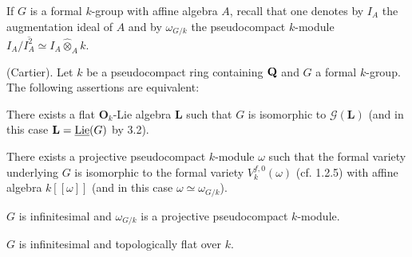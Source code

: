 If $G$ is a formal $k$-group with affine algebra $A$, recall that one denotes by $I_A$ the augmentation ideal of $A$ and by $\omega_{G/k}$ the pseudocompact $k$-module $I_A/\overline{I_A^2}\simeq I_A\widehat\otimes_A k$.
\begin{theorem}{}\label{VIIB.3.3}\textup{(Cartier).}
Let $k$ be a pseudocompact ring containing $\mathbf{Q}$ and $G$ a formal $k$-group. The following assertions are equivalent:
\begin{enumeratei}
\item There exists a flat $\mathbf O_k$-Lie algebra $\mathbf L$ such that $G$ is isomorphic to $\mathscr G(\mathbf L)$ (and in this case $\mathbf L=\underline{\operatorname{Lie}}(G)$ by 3.2).
\item There exists a projective pseudocompact $k$-module $\omega$ such that the formal variety underlying $G$ is isomorphic to the formal variety $V_k^{f,0}(\omega)$ (cf. 1.2.5) with affine algebra $k[[\omega]]$ (and in this case $\omega\simeq\omega_{G/k}$).
\item $G$ is infinitesimal and $\omega_{G/k}$ is a projective pseudocompact $k$-module.
\item $G$ is infinitesimal and topologically flat over $k$.
\end{enumeratei}
\end{theorem}
